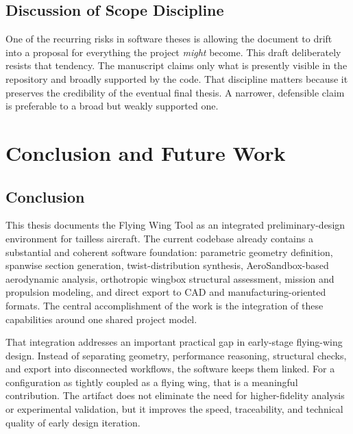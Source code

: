\documentclass[12pt]{report}
\begin{document}
\section{Discussion of Scope Discipline}
One of the recurring risks in software theses is allowing the document to drift into a proposal for everything the project \emph{might} become. This draft deliberately resists that tendency. The manuscript claims only what is presently visible in the repository and broadly supported by the code. That discipline matters because it preserves the credibility of the eventual final thesis. A narrower, defensible claim is preferable to a broad but weakly supported one.

\chapter{Conclusion and Future Work}
\section{Conclusion}
This thesis documents the Flying Wing Tool as an integrated preliminary-design environment for tailless aircraft. The current codebase already contains a substantial and coherent software foundation: parametric geometry definition, spanwise section generation, twist-distribution synthesis, AeroSandbox-based aerodynamic analysis, orthotropic wingbox structural assessment, mission and propulsion modeling, and direct export to CAD and manufacturing-oriented formats. The central accomplishment of the work is the integration of these capabilities around one shared project model.

That integration addresses an important practical gap in early-stage flying-wing design. Instead of separating geometry, performance reasoning, structural checks, and export into disconnected workflows, the software keeps them linked. For a configuration as tightly coupled as a flying wing, that is a meaningful contribution. The artifact does not eliminate the need for higher-fidelity analysis or experimental validation, but it improves the speed, traceability, and technical quality of early design iteration.
\end{document}
